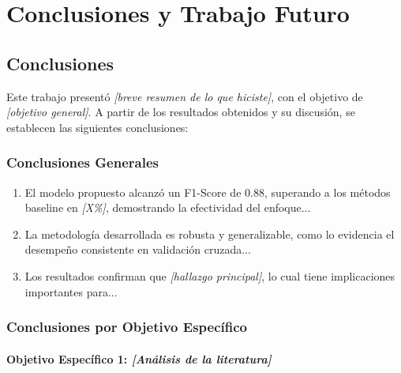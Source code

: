 
\chapter{Conclusiones y Trabajo Futuro}
\label{cap:conclusiones}

\section{Conclusiones}
\label{sec:conclusiones}

Este trabajo presentó \textit{[breve resumen de lo que hiciste]}, con el objetivo de \textit{[objetivo general]}. A partir de los resultados obtenidos y su discusión, se establecen las siguientes conclusiones:

\subsection{Conclusiones Generales}

\begin{enumerate}
    \item El modelo propuesto alcanzó un F1-Score de 0.88, superando a los métodos baseline en \textit{[X\%]}, demostrando la efectividad del enfoque...
    
    \item La metodología desarrollada es robusta y generalizable, como lo evidencia el desempeño consistente en validación cruzada...
    
    \item Los resultados confirman que \textit{[hallazgo principal]}, lo cual tiene implicaciones importantes para...
\end{enumerate}

\subsection{Conclusiones por Objetivo Específico}

\subsubsection{Objetivo Específico 1: \textit{[Análisis de la literatura]}}

